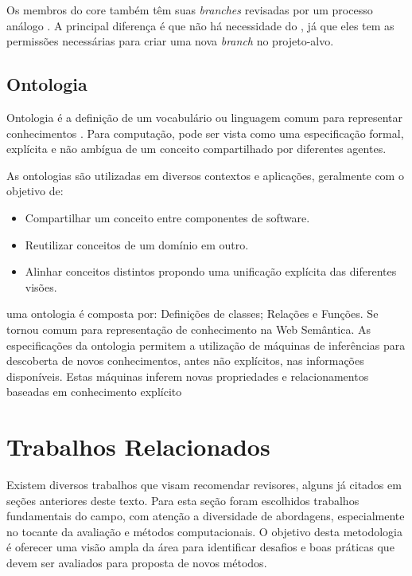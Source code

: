 \documentclass[a4paper,12pt]{monografia}
\theoremstyle{plain}
\theoremstyle{definition}
\theoremstyle{remark}
\begin{document}
  Os membros do core também têm suas \textit{branches} revisadas por um processo análogo \cite{6385140,Bosu2014}. A principal diferença é que não há necessidade do , já que eles tem as permissões necessárias para criar uma nova \textit{branch} no projeto-alvo.

\section{Ontologia}

Ontologia é a definição de um vocabulário ou linguagem comum para representar conhecimentos \cite{gruber1995}. Para computação, pode ser vista como uma especificação formal, explícita e não ambígua de um conceito compartilhado por diferentes agentes.

As ontologias são utilizadas em diversos contextos e aplicações, geralmente com o objetivo de:

\begin{itemize}
  \item Compartilhar um conceito entre componentes de software.
  \item Reutilizar conceitos de um domínio em outro.
  \item Alinhar conceitos distintos propondo uma unificação explícita das diferentes visões.
\end{itemize}

uma ontologia é composta por: Definições de classes; Relações e Funções. Se tornou comum para representação de conhecimento na Web Semântica. As especificações da ontologia permitem a utilização de máquinas de inferências para descoberta de novos conhecimentos, antes não explícitos, nas informações disponíveis. Estas máquinas inferem novas propriedades e relacionamentos baseadas em conhecimento explícito \cite{berners2001}

\chapter{Trabalhos Relacionados}

Existem diversos trabalhos que visam recomendar revisores, alguns já citados em seções anteriores deste texto. Para esta seção foram escolhidos trabalhos fundamentais do campo, com atenção a diversidade de abordagens, especialmente no tocante da avaliação e métodos computacionais. O objetivo desta metodologia é oferecer uma visão ampla da área para identificar desafios e boas práticas que devem ser avaliados para proposta de novos métodos.
\end{document}
